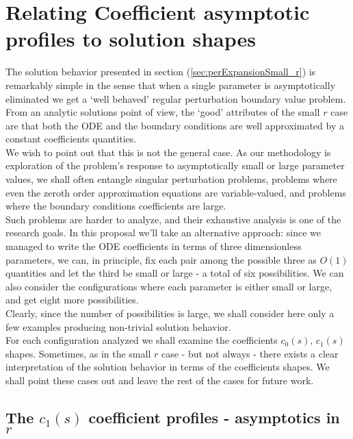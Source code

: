 \documentclass[12pt,twoside]{report}
\begin{document}
\newpage



\section{Relating Coefficient asymptotic profiles to solution shapes}
The solution behavior presented in section (\ref{sec:perExpansionSmall_r}) is remarkably simple in the sense that when a single parameter is asymptotically eliminated we get a `well behaved' regular perturbation boundary value problem.\\
From an analytic solutions point of view, the `good' attributes of the small $r$ case are that both the ODE and the boundary conditions are well approximated by a constant coefficients quantities. \\
We wish to point out that this is not the general case. As our methodology is exploration of the problem's response to asymptotically small or large parameter values, we shall often entangle singular perturbation problems, problems where even the zeroth order approximation equations are variable-valued, and problems where the boundary conditions coefficients are large. \\
Such problems are harder to analyze, and their exhaustive analysis is one of the research goals. In this proposal we'll take an alternative approach: since we managed to write the ODE coefficients in terms of three dimensionless parameters, we can, in principle, fix each pair among the possible three as $O(1)$ quantities and let the third be small or large - a total of six possibilities. We can also consider the configurations where each parameter is either small or large, and get eight more possibilities. \\
Clearly, since the number of possibilities is large, we shall consider here only a few examples producing non-trivial solution behavior.\\
For each configuration analyzed we shall examine the coefficients $c_0(s)$, $c_1(s)$ shapes. Sometimes, as in the small $r$ case - but not always - there exists a clear interpretation of the solution behavior in terms of the coefficients shapes. We shall point these cases out and leave the rest of the cases for future work. 
\newpage

\subsection{The $c_1(s)$  coefficient profiles - asymptotics in $r$}
\end{document}
